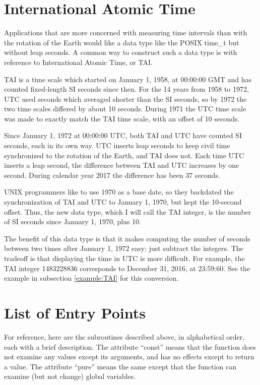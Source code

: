 \documentclass[letterpaper,twoside]{article}
\begin{document}
\section{International Atomic Time}
\label{section:International Atomic Time}
Applications that are more concerned with measuring time intervals than
with the rotation of the Earth would like a data type like the POSIX
{\ttfamily time\_t} but without leap seconds.  A common way to construct
such a data type is with reference to International Atomic Time, or TAI.

TAI is a time scale which started on January 1, 1958, at 00:00:00 GMT
and has counted fixed-length SI seconds since then.  For the 14 years from
1958 to 1972, UTC used seconds which averaged shorter than the SI seconds,
so by 1972 the two time scales differed by about 10 seconds.  During 1971 the
UTC time scale was made to exactly match the TAI time scale, with an offset of
10 seconds.

Since January 1, 1972 at 00:00:00 UTC, both TAI and UTC have counted
SI seconds, each in its own way.  UTC inserts leap seconds to keep
civil time synchronized to the rotation of the Earth, and TAI does not.
Each time UTC inserts a leap second, the difference between TAI and UTC
increases by one second.  During calendar year 2017 the difference has
been 37 seconds.

UNIX programmers like to use 1970 as a base date, so they backdated the
synchronization of TAI and UTC to January 1, 1970, but kept the 10-second
offset.  Thus, the new data type, which I will call the TAI integer,
is the number of SI seconds since January 1, 1970, plus 10.

The benefit of this data type is that it makes computing the number of
seconds between two times after January 1, 1972 easy: just subtract the
integers.  The tradeoff is that displaying the time in UTC is more difficult.
For example, the TAI integer \num{1483228836} corresponds to December 31, 2016,
at 23:59:60.
See the example in subsection \ref{example:TAI} for this conversion.

\section{List of Entry Points}
For reference, here are the subroutines described above, in
alphabetical order, each with a brief description.
The attribute ``const'' means that the function does not examine
any values except its arguments, and has no effects except
to return a value.  The attribute ``pure'' means the same except
that the function can examine (but not change) global variables.
\inputminted[firstline=37,lastline=283]{c}{time_subroutines.h}
\end{document}
